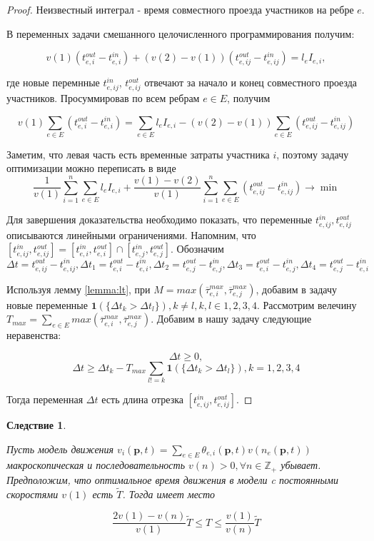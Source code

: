 \documentclass[12pt, a4paper]{article}
\DeclareMathOperator*{\minn}{min}
\newtheorem{corollary}{Следствие}[section]
\begin{document}
\begin{proof}
	Неизвестный интеграл - время совместного проезда участников на ребре $e$.
	  
	В переменных задачи смешанного целочисленного программирования получим:
	
	$$v(1) (t_{e, i}^{out} - t_{e, i}^{in}) + (v(2) - v(1)) (t_{e, ij}^{out} - t_{e, ij}^{in}) = l_e I_{e, i},$$
	
	где новые перемнные $t_{e, ij}^{in}$, $t_{e, ij}^{out}$ отвечают за начало и конец совместного проезда участников. Просуммировав по всем ребрам $e \in E$, получим
	
	$$v(1) \sum \limits _{e \in E} (t_{e, i}^{out} - t_{e, i}^{in}) = \sum \limits _{e \in E} l_e I_{e, i} - (v(2) - v(1)) \sum \limits _{e \in E} (t_{e, ij}^{out} - t_{e, ij}^{in})$$
	
	Заметим, что левая часть есть временные затраты участника $i$, поэтому задачу оптимизации можно переписать в виде
	$$ \frac{1}{v (1)} \sum\limits_{i = 1}^n \sum \limits _{e \in E} l_e I_{e, i} + \frac{v(1) - v(2)}{v (1)}  \sum\limits_{i = 1}^n \sum \limits _{e \in E} (t_{e, ij}^{out} - t_{e, ij}^{in}) \rightarrow \minn $$
	
	Для завершения доказательства необходимо показать, что переменные $t_{e, ij}^{in}, t_{e, ij}^{out}$ описываются линейными ограничениями. Напомним, что $[t_{e, ij}^{in}, t_{e, ij}^{out}] = [t_{e, i}^{in}, t_{e, i}^{out}] \cap [t_{e, j}^{in}, t_{e, j}^{out}]$. Обозначим $\Delta t = t_{e, ij}^{out} - t_{e, ij}^{in}, \Delta t_1 =  t_{e, i}^{out} - t_{e, i}^{in}, \Delta t_2 =  t_{e, j}^{out} - t_{e, j}^{in}, \Delta t_3 =  t_{e, i}^{out} - t_{e, j}^{in}, \Delta t_4 =  t_{e, j}^{out} - t_{e, i}^{in}$
	
	Используя лемму \ref{lemma:lt}, при $M = max (\overline{\tau}_{e, i}^{max}, \overline{\tau}_{e, j}^{max})$, добавим в задачу новые переменные $\textbf{1} (\{ \Delta t_k > \Delta t_l\}), k \ne l, k, l \in {1, 2, 3, 4}$. Рассмотрим велечину $T_{max} = \sum \limits_{e \in E} max (\overline{\tau}_{e, i}^{max}, \overline{\tau}_{e, j}^{max})$. Добавим в нашу задачу следующие неравенства: 
	
	$$\Delta t \ge 0, $$
	$$\Delta t \ge \Delta t_k - T_{max} \sum \limits_{l != k} {\textbf{1} (\{ \Delta t_k > \Delta t_l\})}, k = 1, 2, 3, 4$$
	
	Тогда переменная $\Delta t$ есть длина отрезка $[t_{e, ij}^{in}, t_{e, ij}^{out}]$. 
	
\end{proof}

\begin{corollary}
	\label{corollary:rel}

	Пусть модель движения $ v_i(\textbf{p}, t) = \sum \limits _{e \in E} \theta_{e, i} (\textbf{p}, t) v (n_e (\textbf{p}, t))$ макроскопическая и последовательность $v(n) > 0, \forall n \in \mathbb{Z}_+$ убывает. Предположим, что оптимальное время движения в модели c постоянными скоростями $v(1)$ есть $\widetilde{T}$. Тогда имеет место

	$$ \frac{2 v(1) - v(n)}{v(1)} \widetilde{T} \le T \le \frac {v(1)}{v(n)} \widetilde{T}$$
	
\end{corollary}
\end{document}
